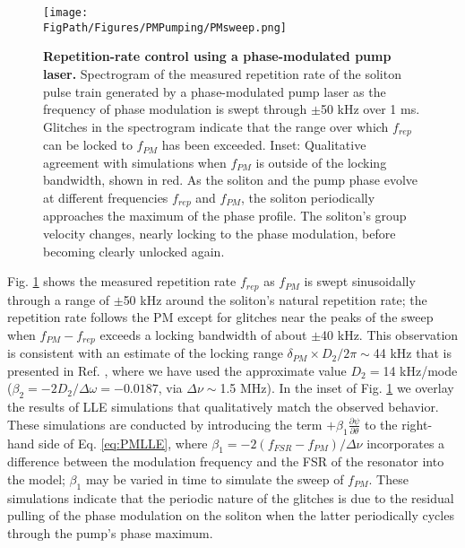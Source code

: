\begin{figure}[htpb]
	\begin{center}
		\texttt{[image: \\FigPath/Figures/PMPumping/PMsweep.png]}
	\end{center}
	\caption[Repetition-rate control using a phase-modulated pump laser]{\textbf{Repetition-rate control using a phase-modulated pump laser.} Spectrogram of the measured repetition rate of the soliton pulse train generated by a phase-modulated pump laser as the frequency of phase modulation is swept through $\pm$50 kHz over 1 ms. Glitches in the spectrogram indicate that the range over which $f_{rep}$ can be locked to $f_{PM}$ has been exceeded. Inset: Qualitative agreement with simulations when $f_{PM}$ is outside of the locking bandwidth, shown in red. As the soliton and the pump phase evolve at different frequencies $f_{rep}$ and $f_{PM}$, the soliton periodically approaches the maximum of the phase profile. The soliton's group velocity changes, nearly locking to the phase modulation, before becoming clearly unlocked again.}
	\label{fig:PMsweep}
\end{figure} 

Fig. \ref{fig:PMsweep} shows the measured repetition rate $f_{rep}$ as $f_{PM}$ is swept sinusoidally through a range of $\pm$50 kHz around the soliton's natural repetition rate; the repetition rate follows the PM except for glitches near the peaks of the sweep when $f_{PM}-f_{rep}$ exceeds a locking bandwidth of about $\pm$40 kHz. This observation is consistent with an estimate of the locking range $\delta_{PM}\times D_2/2\pi\sim$44 kHz that is presented in Ref. \cite{Jang2015a}, where we have used the approximate value $D_2=$14 kHz/mode ($\beta_2=-2D_2/\Delta\omega=-0.0187$, via $\Delta\nu\sim$1.5 MHz). In the inset of Fig. \ref{fig:PMsweep} we overlay the results of LLE simulations that qualitatively match the observed behavior. These simulations are conducted by introducing the term $+\beta_1\frac{\partial\psi}{\partial\theta}$ to the right-hand side of Eq. \ref{eq:PMLLE}, where $\beta_1=-2(f_{FSR}-f_{PM})/\Delta\nu$ incorporates a difference between the modulation frequency and the FSR of the resonator into the model; $\beta_1$ may be varied in time to simulate the sweep of $f_{PM}$. These simulations indicate that the periodic nature of the glitches is due to the residual pulling of the phase modulation on the soliton when the latter periodically cycles through the pump's phase maximum.



